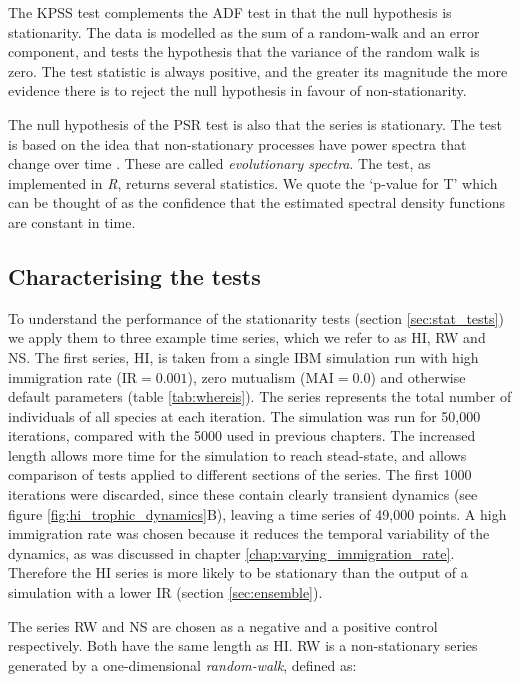 The KPSS test complements the ADF test in that the null hypothesis is stationarity. The data is modelled as the sum of a random-walk and an error component, and tests the hypothesis that the variance of the random walk is zero. The test statistic is always positive, and the greater its magnitude the more evidence there is to reject the null hypothesis in favour of non-stationarity.

The null hypothesis of the PSR test is also that the series is stationary. The test is based on the idea that non-stationary processes have power spectra that change over time \cite{priestley1969test}. These are called \emph{evolutionary spectra}. The test, as implemented in \emph{R}, returns several statistics. We quote the `p-value for T' which can be thought of as the confidence that the estimated spectral density functions are constant in time.

\subsection{Characterising the tests}
\label{sec:characterising_stat_tests}


To understand the performance of the stationarity tests (section \ref{sec:stat_tests}) we apply them to three example time series, which we refer to as HI, RW and NS. The first series, HI, is taken from a single IBM simulation run with high immigration rate (IR$=0.001$), zero mutualism (MAI$=0.0$) and otherwise default parameters (table \ref{tab:whereis}).  The series represents the total number of individuals of all species at each iteration. The simulation was run for 50,000 iterations, compared with the 5000 used in previous chapters. The increased length allows more time for the simulation to reach stead-state, and allows comparison of tests applied to different sections of the series. The first 1000 iterations were discarded, since these contain clearly transient dynamics (see figure \ref{fig:hi_trophic_dynamics}B), leaving a time series of 49,000 points. A high immigration rate was chosen because it reduces the temporal variability of the dynamics, as was discussed in chapter \ref{chap:varying_immigration_rate}. Therefore the HI series is more likely to be stationary than the output of a simulation with a lower IR (section \ref{sec:ensemble}).

The series RW and NS are chosen as a negative and a positive control respectively. Both have the same length as HI. RW is a non-stationary series generated by a one-dimensional \emph{random-walk}, defined as:

